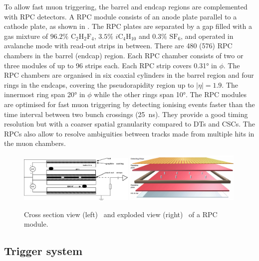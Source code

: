 To allow fast muon triggering, the barrel and endcap regions are complemented with RPC detectors. A RPC module consists of an anode plate parallel to a cathode plate, as shown in . The  RPC plates are separated by a gap filled with a gas mixture of $96.2\%$ $\text{C}_{2}\text{H}_{2}\text{F}_{4}$, $3.5\%$ $i\text{C}_{4}\text{H}_{10}$ and $0.3\%$ $\text{SF}_{6}$, and operated in avalanche mode with read-out strips in between. There are 480 (576) RPC chambers in the barrel (endcap) region. Each RPC chamber consists of two or three modules of up to 96 strips each. Each RPC strip covers \ang{0.31} in $\phi$. The RPC chambers are organised in six coaxial cylinders in the barrel region and four rings in the endcaps, covering the pseudorapidity region up to $|\eta| = 1.9$. The innermost ring span \ang{20} in $\phi$ while the other rings span \ang{10}. The RPC modules are optimised for fast muon triggering by detecting ionising events faster than the time interval between two bunch crossings (\SI{25}{\ns}). They provide a good timing resolution but with a coarser spatial granularity compared to DTs and CSCs. The RPCs also allow to resolve ambiguities between tracks made from multiple hits in the muon chambers.

\begin{figure}[!htbp]
 \centering
 \includegraphics[width=0.49\textwidth]{Figures/Experiment/CMS/RPC_1.png}
 \includegraphics[width=0.49\textwidth]{Figures/Experiment/CMS/RPC_2.png}
 \caption{Cross section view (left)~\cite{CMSMuonRPCFig_1} and exploded view (right)~\cite{CMSMuonRPCFig_2} of a RPC module. }
 \label{fig:CMS_RPC}
\end{figure}



\subsection{Trigger system}\label{sec:Experiment_CMS_Trigger}

